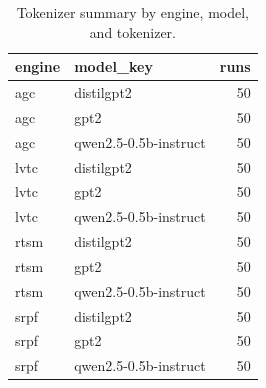 \begin{table}[t]
\centering
\caption{Tokenizer summary by engine, model, and tokenizer.}
\label{tab:tokenizer_summary}
\begin{tabular}{llr}
\toprule
engine & model\_key & runs \\
\midrule
agc & distilgpt2 & 50 \\
agc & gpt2 & 50 \\
agc & qwen2.5-0.5b-instruct & 50 \\
lvtc & distilgpt2 & 50 \\
lvtc & gpt2 & 50 \\
lvtc & qwen2.5-0.5b-instruct & 50 \\
rtsm & distilgpt2 & 50 \\
rtsm & gpt2 & 50 \\
rtsm & qwen2.5-0.5b-instruct & 50 \\
srpf & distilgpt2 & 50 \\
srpf & gpt2 & 50 \\
srpf & qwen2.5-0.5b-instruct & 50 \\
\bottomrule
\end{tabular}
\end{table}
